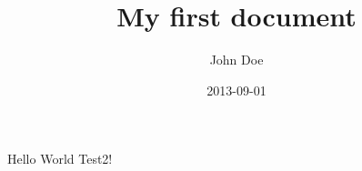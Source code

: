 \documentclass{article}
\title{My first document}
\date{2013-09-01}
\author{John Doe}
\begin{document}
\maketitle
\newpage
{}
Hello World Test2!
\end{document}
